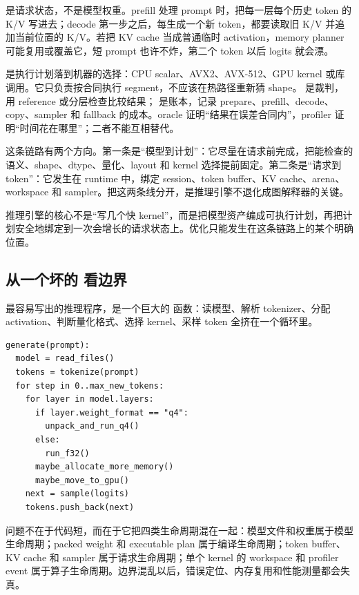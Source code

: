  是请求状态，不是模型权重。prefill 处理 prompt 时，把每一层每个历史 token 的 K/V 写进去；decode 第一步之后，每生成一个新 token，都要读取旧 K/V 并追加当前位置的 K/V。若把 KV cache 当成普通临时 activation，memory planner 可能复用或覆盖它，短 prompt 也许不炸，第二个 token 以后 logits 就会漂。

 是执行计划落到机器的选择：CPU scalar、AVX2、AVX-512、GPU kernel 或库调用。它只负责按合同执行 segment，不应该在热路径重新猜 shape。  是裁判，用 reference 或分层检查比较结果； 是账本，记录 prepare、prefill、decode、copy、sampler 和 fallback 的成本。oracle 证明“结果在误差合同内”，profiler 证明“时间花在哪里”；二者不能互相替代。


这条链路有两个方向。第一条是“模型到计划”：它尽量在请求前完成，把能检查的语义、shape、dtype、量化、layout 和 kernel 选择提前固定。第二条是“请求到 token”：它发生在 runtime 中，绑定 session、token buffer、KV cache、arena、workspace 和 sampler。把这两条线分开，是推理引擎不退化成图解释器的关键。

\begin{keyidea}
推理引擎的核心不是“写几个快 kernel”，而是把模型资产编成可执行计划，再把计划安全地绑定到一次会增长的请求状态上。优化只能发生在这条链路上的某个明确位置。
\end{keyidea}

\subsection{从一个坏的  看边界}

最容易写出的推理程序，是一个巨大的  函数：读模型、解析 tokenizer、分配 activation、判断量化格式、选择 kernel、采样 token 全挤在一个循环里。

\begin{lstlisting}[numbers=none,caption={不可维护的推理主循环形态}]
generate(prompt):
  model = read_files()
  tokens = tokenize(prompt)
  for step in 0..max_new_tokens:
    for layer in model.layers:
      if layer.weight_format == "q4":
        unpack_and_run_q4()
      else:
        run_f32()
      maybe_allocate_more_memory()
      maybe_move_to_gpu()
    next = sample(logits)
    tokens.push_back(next)
\end{lstlisting}

问题不在于代码短，而在于它把四类生命周期混在一起：模型文件和权重属于模型生命周期；packed weight 和 executable plan 属于编译生命周期；token buffer、KV cache 和 sampler 属于请求生命周期；单个 kernel 的 workspace 和 profiler event 属于算子生命周期。边界混乱以后，错误定位、内存复用和性能测量都会失真。

